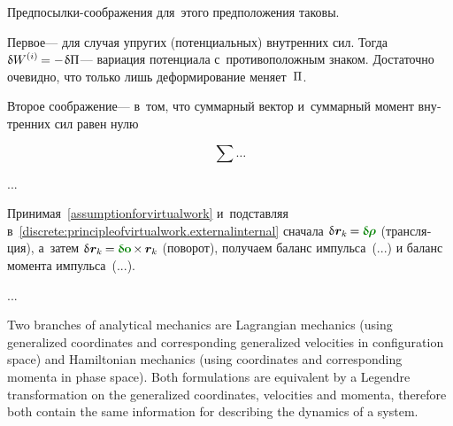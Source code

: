\begin{otherlanguage}{russian}
\vspace{-0.1em}
Предпосылки-соображения для~этого предположения таковы.

Первое\:--- для случая упругих (потенциальных) внутренних сил.
Тогда ${\variation{\internalwork} = - \hspace{.16ex} \variation{\potential}}$\:--- вариация потенциала с~противоположным знаком.
Достаточно очевидно, что только лишь деформирование меняет~$\Pi$.

Второе соображение\:--- в~том, что суммарный вектор и~суммарный момент внутренних сил равен нулю

\begin{equation*}
\sum \ldots
\end{equation*}

...

Принимая~\eqref{assumptionforvirtualwork} и~подставляя в~\eqref{discrete:principleofvirtualwork.externalinternal} сначала ${\variation{\hspace{.1ex}\locationvector_k} \hspace{-0.16ex} = \hspace{-0.08ex} \constvarvector{\hspace{-0.1ex}\bm{\rho}}}$ (трансляция), а~затем ${\variation{\hspace{.1ex}\locationvector_k} \hspace{-0.16ex} = \hspace{-0.08ex} \constvarvector{\bm{o}} \hspace{-0.2ex} \times \hspace{-0.1ex} \locationvector_k}$ (поворот), получаем баланс импульса~(...) и баланс момента импульса~(...).

...



\end{otherlanguage}



{\small
\setlength{\abovedisplayskip}{2pt}\setlength{\belowdisplayskip}{2pt}
Two branches of analytical mechanics are Lagrangian mechanics (using generalized coordinates and corresponding generalized velocities in configuration space) and Hamiltonian mechanics (using coordinates and corresponding momenta in phase space). Both formulations are equivalent by a Legendre transformation on the generalized coordinates, velocities and momenta, therefore both contain the same information for describing the dynamics of a system.

\par}


